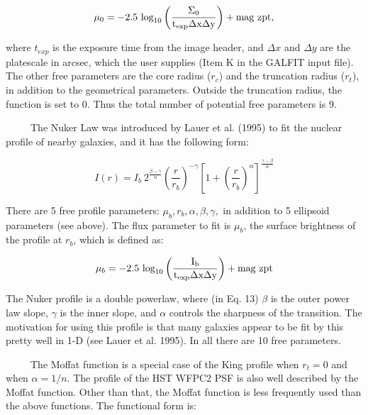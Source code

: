 \documentclass[preprint]{aastex}
\begin{document}
\begin{equation} 
\mu_0 = -2.5\ \rm{log}_{10} \left(\frac{\Sigma_0}{t_{exp} \Delta x \Delta y}\right) + \rm{mag\ zpt},
\end{equation}

\noindent where $t_{exp}$ is the exposure time from the image header, and
$\Delta x$ and $\Delta y$ are the platescale in arcsec, which the user
supplies (Item K in the GALFIT input file).  The other free parameters are the
core radius ($r_c$) and the truncation radius ($r_t$), in addition to the
geometrical parameters.  Outside the truncation radius, the function is set to
0.  Thus the total number of potential free parameters is 9.

\bigskip

\ \ \ \ \ The Nuker Law was introduced by Lauer
et al. (1995) to fit the nuclear profile of nearby galaxies, and it
has the following form:

\begin{equation}
I(r) = I_b \ 2^{\frac{\beta - \gamma} {\alpha}}
\left({\frac{r}{r_b}}\right)^{-\gamma}\left[{1+\left(\frac{r}
{r_b}\right)^{\alpha}} \right] ^{\frac{\gamma-\beta}{\alpha}}
\end{equation}

\noindent There are 5 free profile parameters: $\mu_b, r_b, \alpha, \beta,
\gamma,$ in addition to 5 ellipsoid parameters (see above).  The flux
parameter to fit is $\mu_b$, the surface brightness of the profile at $r_b$,
which is defined as:

\begin{equation}
	\mu_b = -2.5\ \rm{log}_{10} \left(\frac {I_b} {t_{exp} \Delta x \Delta y}\right) + \rm{mag\ zpt}
\end{equation}

\noindent The Nuker profile is a double powerlaw, where (in Eq. 13) $\beta$ is
the outer power law slope, $\gamma$ is the inner slope, and $\alpha$ controls
the sharpness of the transition.  The motivation for using this profile is
that many galaxies appear to be fit by this pretty well in 1-D (see Lauer et
al.  1995).  In all there are 10 free parameters.

\bigskip
{}\ \ \ \ \ The Moffat function is a special
case of the King profile when $r_t=0$ and when $\alpha = 1/n$.  The profile of
the HST WFPC2 PSF is also well described by the Moffat function.  Other than
that, the Moffat function is less frequently used than the above functions.
The functional form is:
\end{document}
